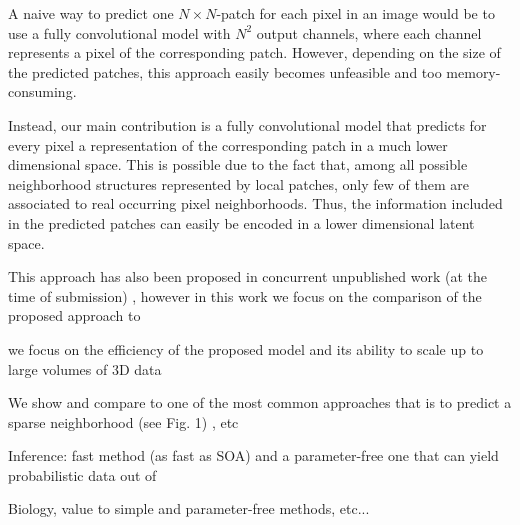 A naive way to predict one $N\times N$-patch for each pixel in an image would be to use a fully convolutional model with $N^2$ output channels, where each channel represents a pixel of the corresponding patch. However, depending on the size of the predicted patches, this approach easily becomes unfeasible and too memory-consuming.

Instead, our main contribution is a fully convolutional model that predicts for every pixel a representation of the corresponding patch in a much lower dimensional space. This is possible due to the fact that, among all possible neighborhood structures represented by local patches, only few of them are associated to real occurring pixel neighborhoods. Thus, the information included in the predicted patches can easily be encoded in a lower dimensional latent space. 

This approach has also been proposed in concurrent unpublished work (at the time of submission) \cite{hirsch2020patchperpix}, however in this work 
we focus on the comparison of the proposed approach to 

we focus on the efficiency of the proposed model and its ability to scale up to large volumes of 3D data

We show and compare to one of the most common approaches that is to predict a sparse neighborhood (see Fig. 1) \cite{liu2018affinity} \cite{wolf2018mutex}, etc

Inference: fast method (as fast as SOA) and a parameter-free one that can yield probabilistic data out of 

Biology, value to simple and parameter-free methods, etc...


